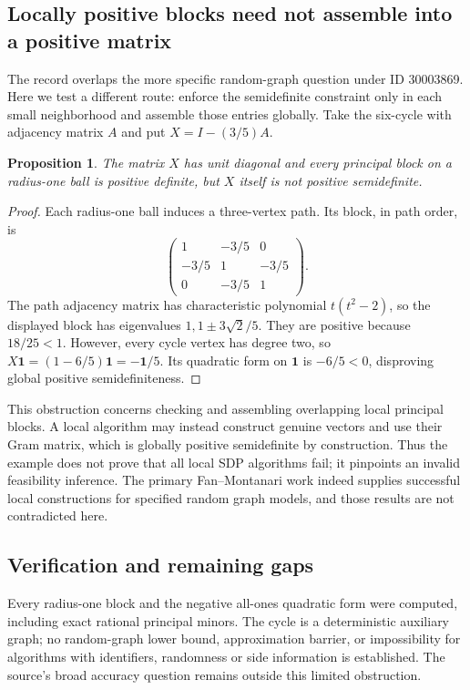 \documentclass[11pt]{article}
\newtheorem{proposition}{Proposition}
\begin{document}
\subsection{Locally positive blocks need not assemble into a positive matrix}
The record overlaps the more specific random-graph question under ID 30003869. Here we test a different route: enforce the semidefinite constraint only in each small neighborhood and assemble those entries globally. Take the six-cycle with adjacency matrix $A$ and put $X=I-(3/5)A$.
\begin{proposition}
The matrix $X$ has unit diagonal and every principal block on a radius-one ball is positive definite, but $X$ itself is not positive semidefinite.
\end{proposition}
\begin{proof}
Each radius-one ball induces a three-vertex path. Its block, in path order, is
\[
\begin{pmatrix}1&-3/5&0\\-3/5&1&-3/5\\0&-3/5&1\end{pmatrix}.
\]
The path adjacency matrix has characteristic polynomial $t(t^2-2)$, so the displayed block has eigenvalues $1,1\pm3\sqrt2/5$. They are positive because $18/25<1$. However, every cycle vertex has degree two, so $X\mathbf1=(1-6/5)\mathbf1=-\mathbf1/5$. Its quadratic form on $\mathbf1$ is $-6/5<0$, disproving global positive semidefiniteness.
\end{proof}
This obstruction concerns checking and assembling overlapping local principal blocks. A local algorithm may instead construct genuine vectors and use their Gram matrix, which is globally positive semidefinite by construction. Thus the example does not prove that all local SDP algorithms fail; it pinpoints an invalid feasibility inference. The primary Fan--Montanari work indeed supplies successful local constructions for specified random graph models, and those results are not contradicted here.
\subsection{Verification and remaining gaps}
Every radius-one block and the negative all-ones quadratic form were computed, including exact rational principal minors. The cycle is a deterministic auxiliary graph; no random-graph lower bound, approximation barrier, or impossibility for algorithms with identifiers, randomness or side information is established. The source's broad accuracy question remains outside this limited obstruction.
\end{document}
